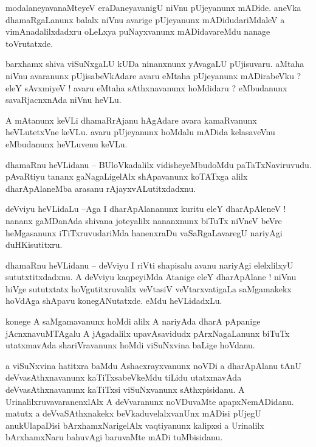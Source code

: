 \documentclass{article}
\begin{document}
\begin{mn}%
modalaneyavanaMteyeV eraDaneyavanigU niVnu pUjeyanunx mADide. aneVka dhamaRgaLanunx balalx niVnu 
avarige pUjeyanunx mADidudariMdaleV a vimAnadalilxdadxru oLeLxya puNayxvanunx mADidavareMdu nanage 
toVrutatxde.
\end{mn}

\begin{mn}%
barxhamx shiva viSuNxgaLU kUDa ninanxnunx yAvagaLU pUjisuvaru. aMtaha niVnu avaranunx 
pUjisabeVkAdare avaru eMtaha pUjeyanunx mADirabeVku ? eleY sAvxmiyeV ! avaru eMtaha sAthxnavanunx 
hoMdidaru ? eMbudanunx savaRjacnxnAda niVnu heVLu.
\end{mn}

\begin{mn}%
A mAtanunx keVLi dhamaRrAjanu hAgAdare avara kamaRvanunx heVLutetxVne keVLu. avaru pUjeyanunx hoMdalu 
mADida kelasaveVnu eMbudanunx heVLuvenu keVLu.
\end{mn}

\begin{mn}%
dhamaRnu heVLidanu -- BUloVkadalilx vidisheyeMbudoMdu paTaTxNaviruvudu. pAvaRtiyu tananx 
gaNagaLigelAlx shApavanunx koTATxga alilx dharApAlaneMba arasanu rAjayxvALutitxdadxnu.
\end{mn}

\begin{mn}%
deVviyu heVLidaLu --Aga I dharApAlananunx kuritu eleY dharApAleneV ! nananx gaMDanAda shivana 
joteyalilx nananxnunx biTuTx niVneV beVre heMgasanunx iTiTxruvudariMda hanenxraDu vaSaRgaLavaregU 
nariyAgi duHKisutitxru.
\end{mn}

\begin{mn}%
dhamaRnu heVLidanu -- deVviyu I riVti shapisalu avanu nariyAgi elelxlilxyU sututxtitxdadxnu. A 
deVviyu kaqpeyiMda Atanige eleY dharApAlane ! niVnu hiVge sututxtatx hoVgutitxruvalilx veVtasiV 
veVtarxvatigaLa saMgamakekx hoVdAga shApavu konegANutatxde. eMdu heVLidadxLu.
\end{mn}

\begin{mn}%
konege A saMgamavanunx hoMdi alilx A nariyAda dharA pApanige jAcnxnavuMTAgalu A jAgadalilx 
upavAsavidudx pArxNagaLanunx biTuTx utatxmavAda shariVravanunx hoMdi viSuNxvina baLige hoVdanu.
\end{mn}

\begin{mn}%
a viSuNxvina hatitxra baMdu Ashacxrayxvanunx noVDi a dharApAlanu tAnU deVvasAthxnavanunx 
kaTiTxsabeVkeMdu tiLidu utatxmavAda deVvasAthxnavanunx kaTiTxsi viSuNxvanunx sAthxpisidanu. A 
UrinalilxruvavaranenxlAlx A deVvaranunx noVDuvaMte apapxNemADidanu. matutx a deVvaSAthxnakekx 
beVkaduvelalxvanUnx mADisi pUjegU anukUlapaDisi bArxhamxNarigelAlx vaqtiyanunx kalipxsi a Urinalilx 
bArxhamxNaru bahuvAgi baruvaMte mADi tuMbisidanu.
\end{mn}
\end{document}
